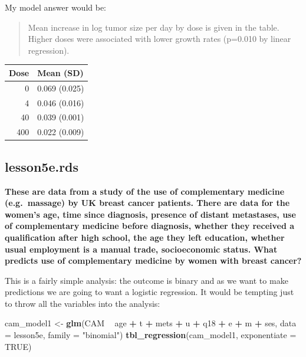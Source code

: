 \documentclass[]{book}
\newenvironment{Shaded}{\begin{snugshade}}{\end{snugshade}}
\newcommand{\DataTypeTok}[1]{\textcolor[rgb]{0.13,0.29,0.53}{#1}}
\newcommand{\KeywordTok}[1]{\textcolor[rgb]{0.13,0.29,0.53}{\textbf{#1}}}
\newcommand{\NormalTok}[1]{#1}
\newcommand{\OperatorTok}[1]{\textcolor[rgb]{0.81,0.36,0.00}{\textbf{#1}}}
\newcommand{\OtherTok}[1]{\textcolor[rgb]{0.56,0.35,0.01}{#1}}
\newcommand{\StringTok}[1]{\textcolor[rgb]{0.31,0.60,0.02}{#1}}
\begin{document}
My model answer would be:

\begin{quote}
Mean increase in log tumor size per day by dose is given in the table. Higher doses were associated with lower growth rates (p=0.010 by linear regression).
\end{quote}

\captionsetup[table]{labelformat=empty,skip=1pt}
\begin{longtable}{rl}
\toprule
Dose & Mean (SD) \\ 
\midrule
0 & 0.069 (0.025) \\ 
4 & 0.046 (0.016) \\ 
40 & 0.039 (0.001) \\ 
400 & 0.022 (0.009) \\ 
\bottomrule
\end{longtable}

\hypertarget{lesson5e.rds}{%
\subsection{lesson5e.rds}\label{lesson5e.rds}}

\textbf{These are data from a study of the use of complementary medicine (e.g.~massage) by UK breast cancer patients. There are data for the women's age, time since diagnosis, presence of distant metastases, use of complementary medicine before diagnosis, whether they received a qualification after high school, the age they left education, whether usual employment is a manual trade, socioeconomic status. What predicts use of complementary medicine by women with breast cancer?}

This is a fairly simple analysis: the outcome is binary and as we want to make predictions we are going to want a logistic regression. It would be tempting just to throw all the variables into the analysis:

\begin{Shaded}
\begin{Highlighting}[]
\NormalTok{cam_model1 <-}\StringTok{ }\KeywordTok{glm}\NormalTok{(CAM }\OperatorTok{~}\StringTok{ }\NormalTok{age }\OperatorTok{+}\StringTok{ }\NormalTok{t }\OperatorTok{+}\StringTok{ }\NormalTok{mets }\OperatorTok{+}\StringTok{ }\NormalTok{u }\OperatorTok{+}\StringTok{ }\NormalTok{q18 }\OperatorTok{+}\StringTok{ }\NormalTok{e }\OperatorTok{+}\StringTok{ }\NormalTok{m }\OperatorTok{+}\StringTok{ }\NormalTok{ses,}
                  \DataTypeTok{data =}\NormalTok{ lesson5e,}
                  \DataTypeTok{family =} \StringTok{"binomial"}\NormalTok{)}
\KeywordTok{tbl_regression}\NormalTok{(cam_model1, }\DataTypeTok{exponentiate =} \OtherTok{TRUE}\NormalTok{)}
\end{Highlighting}
\end{Shaded}
\end{document}
